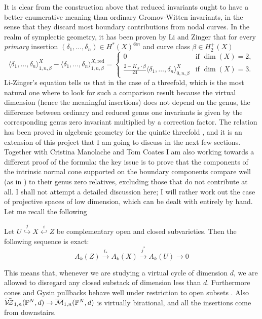 It is clear from the construction above that reduced invariants ought to have a better enumerative meaning than ordinary Gromov-Witten invariants, in the sense that they discard most boundary contributions from nodal curves. In the realm of symplectic geometry, it has been proven by Li and Zinger \cite{LZ} that for every \emph{primary} insertion $(\delta_1,\ldots,\delta_n)\in H^*(X)^{\otimes n}$ and curve class $\beta\in H^+_2(X)$
\[
 \langle \delta_1,\ldots,\delta_n \rangle^X_{1,n,\beta}-\langle \delta_1,\ldots,\delta_n \rangle^{X,\mathrm{red}}_{1,n,\beta}=\begin{cases}
 0 & \text{if } \dim(X)=2, \\
 \frac{2-K_X\cdot\beta}{24}\langle \delta_1,\ldots,\delta_n \rangle^X_{0,n,\beta} & \text{if } \dim(X)=3.\end{cases}
\]
Li-Zinger's equation tells us that in the case of a threefold, which is the most natural one where to look for such a comparison result because the virtual dimension (hence the meaningful insertions) does not depend on the genus, the difference between ordinary and reduced genus one invariants is given by the corresponding genus zero invariant multiplied by a correction factor. The relation has been proved in algebraic geometry for the quintic threefold \cite{CL}, and it is an extension of this project that I am going to discuss in the next few sections. Together with Cristina Manolache and Tom Coates I am also working towards a different proof of the formula: the key issue is to prove that the components of the intrinsic normal cone supported on the boundary components compare well (as in \cite{Manolache-push}) to their genus zero relatives, excluding those that do not contribute at all. I shall not attempt a detailed discussion here; I will rather work out the case of projective spaces of low dimension, which can be dealt with entirely by hand. Let me recall the following
\begin{lemma}\cite[Proposition 1.8]{Ful}
Let $U\overset{j}{\hookrightarrow} X \overset{i}{\hookleftarrow} Z$ be complementary open and closed subvarieties. Then the following sequence is exact:
\[A_k(Z)\overset{i_*}{\to} A_k(X)\overset{j^*}{\to} A_k(U)\to 0\]
\end{lemma}
This means that, whenever we are studying a virtual cycle of dimension $d$, we are allowed to disregard any closed substack of dimension less than $d$. Furthermore cones and Gysin pullbacks behave well under restriction to open subsets \cite[Proposition 4.2(b) and Theorem 6.2(b)]{Ful}. Also $\widetilde{\mathcal{V\!Z}}_{1,n}(\mathbb P^N,d)\rightarrow \overline{\mathcal{M}}_{1,n}(\mathbb P^N,d)$ is virtually birational, and all the insertions come from downstairs.  

